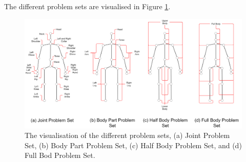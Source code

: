 The different problem sets are visualised in Figure \ref{fig:ps}.

\begin{figure}[ht]
  \centering
  \includegraphics[width=\textwidth]{figures/HPE/problem_sets.png}
  \caption[Visualisation of the Problemsets]{The visualisation of the different problem sets, (a) Joint Problem Set, (b) Body Part Problem Set, (c) Half Body Problem Set, and (d) Full Bod Problem Set.}
  \label{fig:ps}
\end{figure}
